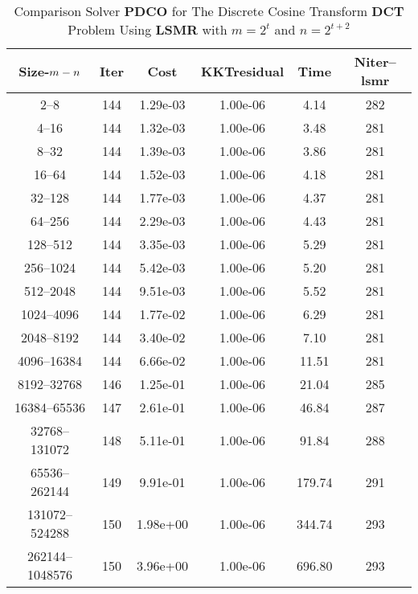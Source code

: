 \documentclass[letterpaper,12pt,oneside,final]{book}
\begin{document}
\begin{table}
\caption{Comparison Solver  {\bf PDCO}  for  The Discrete Cosine Transform {\bf DCT} Problem Using {\bf LSMR} with $m=2^{t}$ and $n=2^{t+2}$} 
\begin{center}
\begin{tabular}{|*{6}{c}|} \hline
Size-$m\--n$& \multicolumn{1}{c}{Iter} & \multicolumn{1}{c}{Cost} & \multicolumn{1}{c}{KKTresidual} & \multicolumn{1}{c}{Time} & \multicolumn{1}{c|}{Niter--lsmr} \\
\hline
2--8            &144  & 1.29e-03& 1.00e-06& 4.14 & 282   \\
4--16           &144  & 1.32e-03& 1.00e-06& 3.48 & 281   \\
8--32           &144  & 1.39e-03& 1.00e-06& 3.86 & 281   \\
16--64          &144  & 1.52e-03& 1.00e-06& 4.18 & 281   \\
32--128         &144  & 1.77e-03& 1.00e-06& 4.37 & 281   \\
64--256         &144  & 2.29e-03& 1.00e-06& 4.43 & 281   \\
128--512        &144  & 3.35e-03& 1.00e-06& 5.29 & 281   \\
256--1024       &144  & 5.42e-03& 1.00e-06& 5.20 & 281   \\
512--2048       &144  & 9.51e-03& 1.00e-06& 5.52 & 281   \\
1024--4096      &144  & 1.77e-02& 1.00e-06& 6.29 & 281   \\
2048--8192      &144  & 3.40e-02& 1.00e-06& 7.10 & 281   \\
4096--16384     &144  & 6.66e-02& 1.00e-06& 11.51& 281   \\
8192--32768     &146  & 1.25e-01& 1.00e-06& 21.04& 285   \\
16384--65536    &147  & 2.61e-01& 1.00e-06& 46.84& 287   \\
32768--131072   &148  & 5.11e-01& 1.00e-06& 91.84& 288   \\
65536--262144   &149  & 9.91e-01& 1.00e-06& 179.74& 291   \\
131072--524288  &150  & 1.98e+00& 1.00e-06& 344.74& 293   \\
262144--1048576 &150  & 3.96e+00& 1.00e-06& 696.80& 293   \\


\end{tabular}
\end{center}
\end{table}
\end{document}
